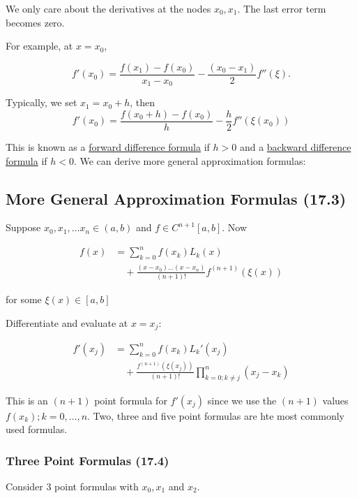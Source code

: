 We only care about the derivatives at the nodes $x_0, x_1$. The last error term
becomes zero.

\pagebreak
For example, at $x=x_0$,

\[
f'(x_0) = \frac{f(x_1) - f(x_0)}{x_1 - x_0} - \frac{(x_0 - x_1)}{2} f''(\xi)
.\]

Typically, we set $x_1 = x_0+h$, then
\begin{equation}
  f'(x_0) = \frac{f(x_0+h) - f(x_0)}{h} - \frac{h}{2} f''(\xi(x_0))
  \label{eq:difference_formula}
\end{equation}

This is known as a \uline{forward difference formula} if $h>0$ and a \uline{backward
difference formula} if $h<0$. We can derive more general approximation formulas:

\subsection{More General Approximation Formulas (17.3)}\label{sec:more_general_approximation_formulas}

Suppose $x_0, x_1, \dots x_n \in (a,b)$ and $f\in C^{n+1}[a,b]$. Now

\begin{align*}
  f(x) &= \sum_{k=0}^n f(x_k) L_k(x) \\
  &\quad+ \frac{(x-x_0)\dots (x-x_n)}{(n+1)!} f^{(n+1)}(\xi(x))
\end{align*}

for some $\xi(x) \in [a,b]$

Differentiate and evaluate at $x=x_j$:

\begin{align*}
  f'(x_j) &= \sum_{k=0}^n f(x_k) L_k'(x_j) \\
          &\quad+ \frac{f^{(n+1)}(\xi(x_j))}{(n+1)!} \prod_{k=0; k\neq j}^{n} (x_j - x_k)
          \label{eq:three_point_formula}
\end{align*}

This is an $(n+1)$ point formula for $f'(x_j)$ since we use the $(n+1)$ values
$f(x_k); k=0,\dots,n$. Two, three and five point formulas are hte most commonly
used formulas.

\subsubsection{Three Point Formulas (17.4)}

Consider $3$ point formulas with $x_0, x_1$ and $x_2$.

